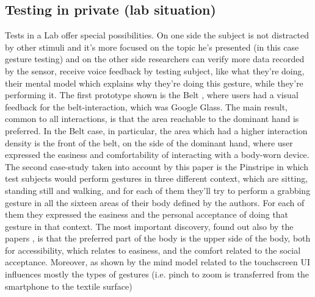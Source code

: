 \documentclass{sigchi}
\begin{document}
\subsection{Testing in private (lab situation)}
Tests in a Lab offer special possibilities. On one side the subject is not distracted by other stimuli and it’s more focused on the topic he’s presented (in this case gesture testing) and on the other side researchers can verify more data recorded by the sensor, receive voice feedback by testing subject, like what they’re doing, their mental model which explains why they’re doing this gesture, while they’re performing it.
The first prototype shown is the Belt \cite{belt}, where users had a visual feedback for the belt-interaction, which was Google Glass. The main result, common to all interactions, is that the area reachable to the dominant hand is preferred. In the Belt case, in particular, the area which had a higher interaction density is the front of the belt, on the side of the dominant hand, where user expressed the easiness and comfortability of interacting with a body-worn device. The second case-study taken into account by this paper is the Pinstripe \cite{pinstripe} in which test subjects would perform gestures in three different context, which are sitting, standing still and walking, and  for each of them they’ll try to perform a grabbing gesture in all the sixteen areas of their body defined by the authors. For each of them they expressed the easiness and the personal acceptance of doing that gesture in that context. The most important discovery, found out also by the  papers \cite{social-comfort, belt}, is that the preferred part of the body is the upper side of the body, both for accessibility, which relates to easiness, and the comfort related to the social acceptance.
Moreover, as shown by \cite{more-touch} the mind model related to the touchscreen UI influences mostly the types of gestures (i.e. pinch to zoom is transferred from the smartphone to the textile surface)
\end{document}
